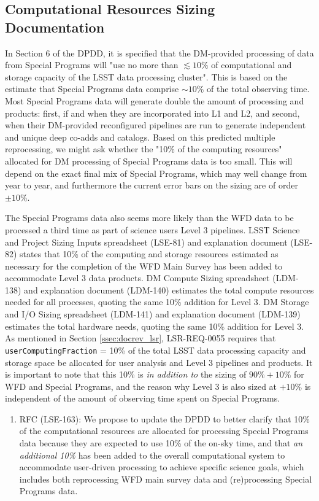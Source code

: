 \subsection{Computational Resources Sizing Documentation}\label{ssec:docrev_sizing}

In Section 6 of the DPDD, it is specified that the DM-provided processing of data from Special Programs will "use no more than $\lesssim10\%$ of computational and storage capacity of the LSST data processing cluster". This is based on the estimate that Special Programs data comprise $\sim10\%$ of the total observing time. Most Special Programs data will generate double the amount of processing and products: first, if and when they are incorporated into L1 and L2, and second, when their DM-provided reconfigured pipelines are run to generate independent and unique deep co-adds and catalogs. Based on this predicted multiple reprocessing, we might ask whether the "10\% of the computing resources" allocated for DM processing of Special Programs data is too small. This will depend on the exact final mix of Special Programs, which may well change from year to year, and furthermore the current error bars on the sizing are of order $\pm10\%$.

The Special Programs data also seems more likely than the WFD data to be processed a third time as part of science users Level 3 pipelines. LSST Science and Project Sizing Inputs spreadsheet (LSE-81) and explanation document (LSE-82) states that 10\% of the computing and storage resources estimated as necessary for the completion of the WFD Main Survey has been added to accommodate Level 3 data products. DM Compute Sizing spreadsheet (LDM-138) and explanation document (LDM-140) estimates the total compute resources needed for all processes, quoting the same 10\% addition for Level 3. DM Storage and I/O Sizing spreadsheet (LDM-141) and explanation document (LDM-139) estimates the total hardware needs, quoting the same 10\% addition for Level 3. As mentioned in Section \ref{ssec:docrev_lsr}, LSR-REQ-0055 requires that \texttt{userComputingFraction} = 10\% of the total LSST data processing capacity and storage space be allocated for user analysis and Level 3 pipelines and products. It is important to note that this 10\% is \textit{in addition to} the sizing of $90\%+10\%$ for WFD and Special Programs, and the reason why Level 3 is also sized at $+10\%$ is independent of the amount of observing time spent on Special Programs.

\begin{enumerate}[resume,topsep=-10pt,label= \textbf{Action \Roman*}] \item \label{Size-1} RFC (LSE-163): We propose to update the DPDD to better clarify that 10\% of the computational resources are allocated for processing Special Programs data because they are expected to use 10\% of the on-sky time, and that \textit{an additional 10\%} has been added to the overall computational system to accommodate user-driven processing to achieve specific science goals, which includes both reprocessing WFD main survey data and (re)processing Special Programs data. \end{enumerate}

